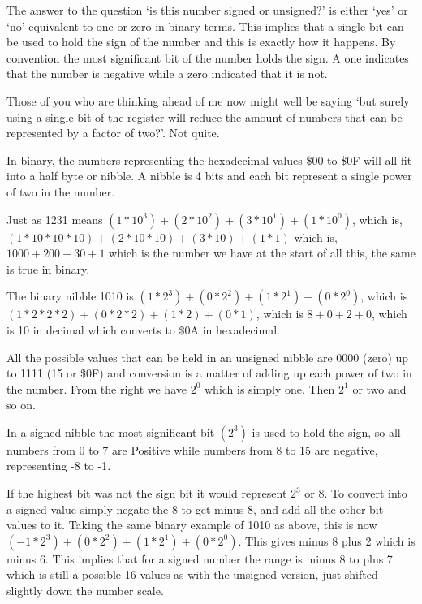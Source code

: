The answer to the question `is this number signed or unsigned?' is
    either `yes' or `no' equivalent to one or zero in binary terms. This
    implies that a single bit can be used to hold the sign of the number and
    this is exactly how it happens. By convention the most significant bit of
    the number holds the sign. A one indicates that the number is negative
    while a zero indicated that it is not.

Those of you who are thinking ahead of me now might well be saying
    `but surely using a single bit of the register will reduce the amount of
    numbers that can be represented by a factor of two?'. Not quite.

In binary, the numbers representing the hexadecimal values \$00 to
    \$0F will all fit into a half byte or nibble. A nibble is 4 bits and each
    bit represent a single power of two in the number.

Just as 1231 means $(1 * 10^{3}) + (2 * 10^{2}) + (3 * 10^{1}) + (1 * 10^{0})$, which is, $(1 * 10 * 10 * 10) + (2 * 10 * 10) + (3 * 10) + (1 * 1)$
    which is, $1000 + 200 + 30 + 1$ which is the number we have at the start of
    all this, the same is true in binary.

The binary nibble 1010 is $(1 * 2^{3}) + (0 * 2^{2}) + (1 * 2^{1}) + (0 * 2^{0})$, which is $(1 * 2 * 2 * 2) + (0 * 2 * 2) + (1 * 2) + (0 * 1)$, which is
    $8 + 0 + 2 + 0$, which is 10 in decimal which converts to \$0A in hexadecimal.

All the possible values that can be held in an unsigned nibble are
    0000 (zero) up to 1111 (15 or \$0F) and conversion is a matter of adding up
    each power of two in the number. From the right we have $2^{0}$ which is simply one. Then $2^{1}$ or two and so on.

In a signed nibble the most significant bit $(2^{3})$ is used to hold
    the sign, so all numbers from 0 to 7 are Positive while numbers from 8 to 15 are negative, representing -8 to -1.

If the highest bit was not the sign bit it would represent $2^{3}$ or 8.
    To convert into a signed value simply negate the 8 to get minus 8, and add
    all the other bit values to it. Taking the same binary example of 1010 as
    above, this is now
$(-{}1 * 2^{3}) + (0 * 2^{2}) + (1 * 2^{1}) + (0 * 2^{0})$. This 
    gives minus 8 plus 2 which is minus 6. This implies that for a signed
    number the range is minus 8 to plus 7 which is still a possible 16 values as with
    the unsigned version, just shifted slightly down the number scale.

